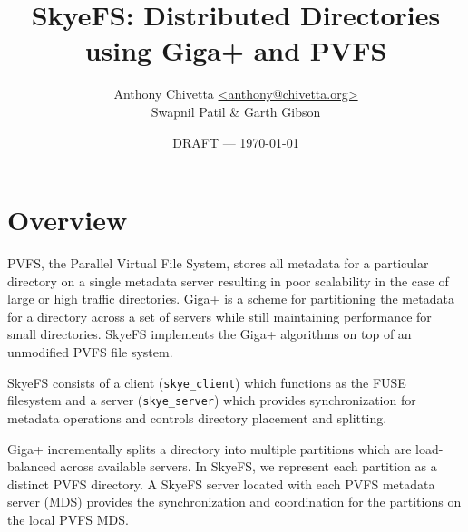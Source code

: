 \documentclass[twocolumn,letterpaper]{article}
\title{SkyeFS: Distributed Directories using Giga+ and PVFS}
\author{Anthony Chivetta \url{<anthony@chivetta.org>}\\Swapnil Patil \& Garth
Gibson}
\date{DRAFT --- \today}
\newcommand{\code}[1]{\texttt{#1}}
\begin{document}


\section{Overview}
PVFS, the Parallel Virtual File System, stores all metadata for a particular
directory on a single metadata server\cite{pvfs} resulting in poor scalability in the case
of large or high traffic directories.  Giga+ is a scheme for partitioning the
metadata for a directory across a set of servers while still maintaining
performance for small directories.\cite{gigaplus}  SkyeFS implements the Giga+ algorithms on
top of an unmodified PVFS file system.

SkyeFS consists of a client (\code{skye\_\-client}) which functions as the
FUSE filesystem and a server (\code{skye\_\-server}) which provides
synchronization for metadata operations and controls directory placement and
splitting.\cite{fuse}  

Giga+ incrementally splits a directory into multiple partitions which are
load-balanced across available servers.  In SkyeFS, we represent each
partition as a distinct PVFS directory.  A SkyeFS server located with each
PVFS metadata server (MDS) provides the synchronization and coordination for
the partitions on the local PVFS MDS. 
\end{document}

